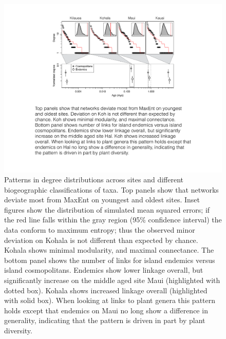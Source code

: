 \documentclass[12pt]{article}
\begin{document}
\begin{linenumbers}
\begin{figure}[!hp]
  \centering
  \includegraphics[scale=0.8]{fig_degree.pdf} 
  \caption{Patterns in degree distributions across sites and different
    biogeographic classifications of taxa. Top panels show that
    networks deviate most from MaxEnt on youngest and oldest
    sites. Inset figures show the distribution of simulated mean
    squared errors; if the red line falls within the gray region (95\%
    confidence interval) the data conform to maximum entropy; thus the
    observed minor deviation on Kohala is not different than expected
    by chance. Kohala shows minimal modularity, and maximal
    connectance. The bottom panel shows the number of links for island
    endemics versus island cosmopolitans. Endemics show lower linkage
    overall, but significantly increase on the middle aged site Maui
    (highlighted with dotted box). Kohala shows increased linkage
    overall (highlighted with solid box). When looking at links to
    plant genera this pattern holds except that endemics on Maui no
    long show a difference in generality, indicating that the pattern
    is driven in part by plant diversity.}
  \label{fig:degree}
\end{figure}


\end{linenumbers}
\end{document}
